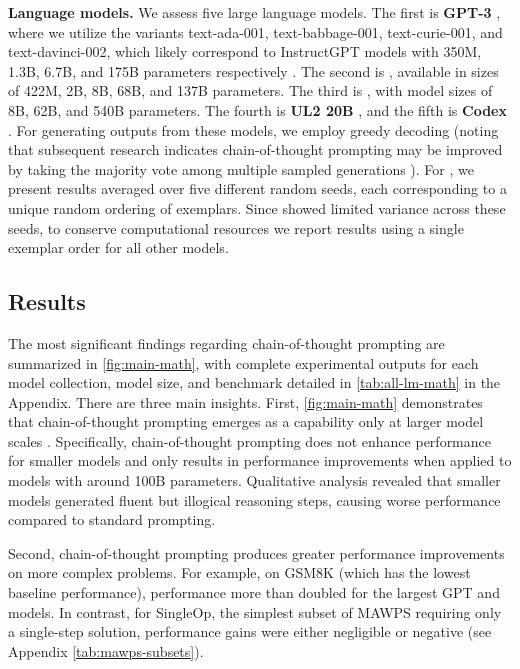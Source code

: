 \textbf{Language models.} We assess five large language models. The first is \textbf{GPT-3} \citep{brown2020language}, where we utilize the variants text-ada-001, text-babbage-001, text-curie-001, and text-davinci-002, which likely correspond to InstructGPT models with 350M, 1.3B, 6.7B, and 175B parameters respectively \citep{ouyang2022training}. The second is \textbf{\lamda{}} \citep{thoppilan2022lamda}, available in sizes of 422M, 2B, 8B, 68B, and 137B parameters. The third is \textbf{\palm{}}, with model sizes of 8B, 62B, and 540B parameters. The fourth is \textbf{UL2 20B} \citep{tay2022unifying}, and the fifth is \textbf{Codex} \citep[][code-davinci-002 in the OpenAI API]{chen2021evaluating}. For generating outputs from these models, we employ greedy decoding (noting that subsequent research indicates chain-of-thought prompting may be improved by taking the majority vote among multiple sampled generations \citep{wang2022self}). For \lamda{}, we present results averaged over five different random seeds, each corresponding to a unique random ordering of exemplars. Since \lamda{} showed limited variance across these seeds, to conserve computational resources we report results using a single exemplar order for all other models.

\subsection{Results}
The most significant findings regarding chain-of-thought prompting are summarized in \cref{fig:main-math}, with complete experimental outputs for each model collection, model size, and benchmark detailed in \cref{tab:all-lm-math} in the Appendix. There are three main insights. First, \cref{fig:main-math} demonstrates that chain-of-thought prompting emerges as a capability only at larger model scales \citep{wei2022emergent}. Specifically, chain-of-thought prompting does not enhance performance for smaller models and only results in performance improvements when applied to models with around 100B parameters. Qualitative analysis revealed that smaller models generated fluent but illogical reasoning steps, causing worse performance compared to standard prompting.


Second, chain-of-thought prompting produces greater performance improvements on more complex problems. For example, on GSM8K (which has the lowest baseline performance), performance more than doubled for the largest GPT and \palm{} models. In contrast, for SingleOp, the simplest subset of MAWPS requiring only a single-step solution, performance gains were either negligible or negative (see Appendix \cref{tab:mawps-subsets}).

